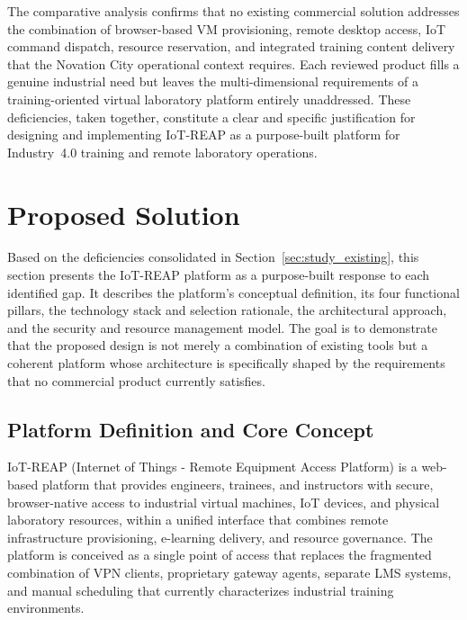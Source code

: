 The comparative analysis confirms that no existing commercial solution addresses
the combination of browser-based VM provisioning, remote desktop access,
IoT command dispatch, resource reservation, and
integrated training content delivery that the Novation City operational context
requires. Each reviewed product fills a genuine industrial need but leaves the
multi-dimensional requirements of a training-oriented virtual laboratory platform
entirely unaddressed. These deficiencies, taken together, constitute a clear and
specific justification for designing and implementing IoT-REAP as a purpose-built
platform for Industry~4.0 training and remote laboratory operations.

\section{Proposed Solution}
\label{sec:proposed_solution}

Based on the deficiencies consolidated in Section~\ref{sec:study_existing}, this section presents the
IoT-REAP platform as a purpose-built response to each identified gap. It describes
the platform's conceptual definition, its four functional pillars, the technology
stack and selection rationale, the architectural approach, and the security and
resource management model. The goal is to demonstrate that the proposed design is
not merely a combination of existing tools but a coherent platform whose architecture
is specifically shaped by the requirements that no commercial product currently
satisfies.

\subsection{Platform Definition and Core Concept}

IoT-REAP (Internet of Things - Remote Equipment Access Platform) is a web-based
platform that provides engineers, trainees, and instructors with secure, browser-native
access to industrial virtual machines, IoT devices, and physical laboratory resources,
within a unified interface that combines remote infrastructure provisioning,
e-learning delivery, and resource governance. The platform is conceived as a single
point of access that replaces the fragmented combination of VPN clients, proprietary
gateway agents, separate LMS systems, and manual scheduling that currently characterizes
industrial training environments.

